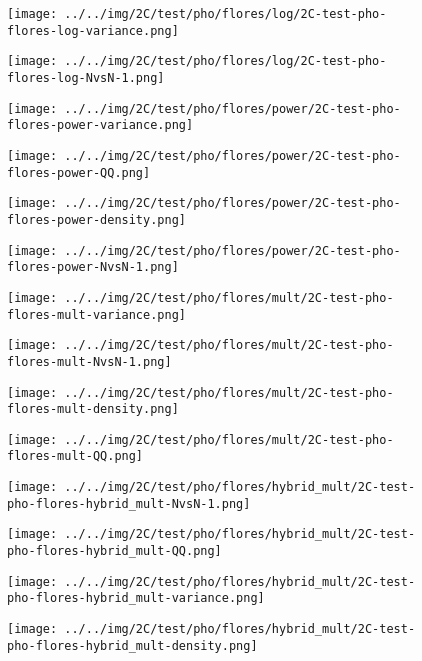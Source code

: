 \begin{figure}[H]
\centering	\texttt{[image: ../../img/2C/test/pho/flores/log/2C-test-pho-flores-log-variance.png]}
\end{figure}
\begin{figure}[H]
\centering	\texttt{[image: ../../img/2C/test/pho/flores/log/2C-test-pho-flores-log-NvsN-1.png]}
\end{figure}
\begin{figure}[H]
\centering	\texttt{[image: ../../img/2C/test/pho/flores/power/2C-test-pho-flores-power-variance.png]}
\end{figure}
\begin{figure}[H]
\centering	\texttt{[image: ../../img/2C/test/pho/flores/power/2C-test-pho-flores-power-QQ.png]}
\end{figure}
\begin{figure}[H]
\centering	\texttt{[image: ../../img/2C/test/pho/flores/power/2C-test-pho-flores-power-density.png]}
\end{figure}
\begin{figure}[H]
\centering	\texttt{[image: ../../img/2C/test/pho/flores/power/2C-test-pho-flores-power-NvsN-1.png]}
\end{figure}
\begin{figure}[H]
\centering	\texttt{[image: ../../img/2C/test/pho/flores/mult/2C-test-pho-flores-mult-variance.png]}
\end{figure}
\begin{figure}[H]
\centering	\texttt{[image: ../../img/2C/test/pho/flores/mult/2C-test-pho-flores-mult-NvsN-1.png]}
\end{figure}
\begin{figure}[H]
\centering	\texttt{[image: ../../img/2C/test/pho/flores/mult/2C-test-pho-flores-mult-density.png]}
\end{figure}
\begin{figure}[H]
\centering	\texttt{[image: ../../img/2C/test/pho/flores/mult/2C-test-pho-flores-mult-QQ.png]}
\end{figure}
\begin{figure}[H]
\centering	\texttt{[image: ../../img/2C/test/pho/flores/hybrid\_mult/2C-test-pho-flores-hybrid\_mult-NvsN-1.png]}
\end{figure}
\begin{figure}[H]
\centering	\texttt{[image: ../../img/2C/test/pho/flores/hybrid\_mult/2C-test-pho-flores-hybrid\_mult-QQ.png]}
\end{figure}
\begin{figure}[H]
\centering	\texttt{[image: ../../img/2C/test/pho/flores/hybrid\_mult/2C-test-pho-flores-hybrid\_mult-variance.png]}
\end{figure}
\begin{figure}[H]
\centering	\texttt{[image: ../../img/2C/test/pho/flores/hybrid\_mult/2C-test-pho-flores-hybrid\_mult-density.png]}
\end{figure}
